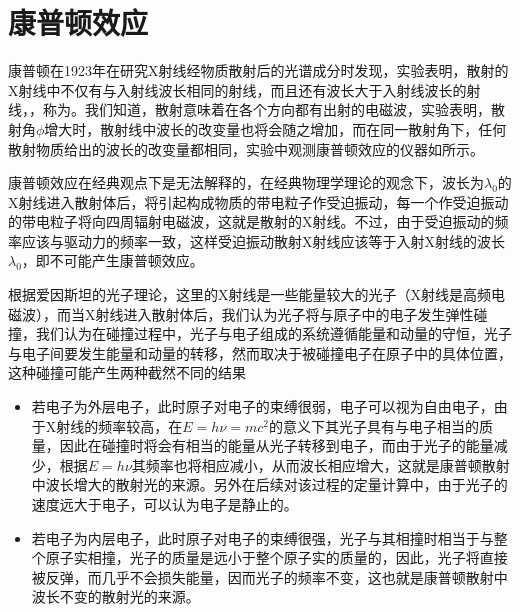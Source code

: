 \section{康普顿效应}
\label{sec:康普顿效应}
康普顿在1923年在研究X射线经物质散射后的光谱成分时发现，实验表明，散射的X射线中不仅有与入射线波长相同的射线，而且还有波长大于入射线波长的射线，，称为。我们知道，散射意味着在各个方向都有出射的电磁波，实验表明，散射角$\phi$增大时，散射线中波长的改变量也将会随之增加，而在同一散射角下，任何散射物质给出的波长的改变量都相同，实验中观测康普顿效应的仪器如所示。\goodbreak

康普顿效应在经典观点下是无法解释的，在经典物理学理论的观念下，波长为$\lambda_0$的X射线进入散射体后，将引起构成物质的带电粒子作受迫振动，每一个作受迫振动的带电粒子将向四周辐射电磁波，这就是散射的X射线。不过，由于受迫振动的频率应该与驱动力的频率一致，这样受迫振动散射X射线应该等于入射X射线的波长$\lambda_0$，即不可能产生康普顿效应。
\begin{OldFigure}[康普顿效应的实验仪器]
\end{OldFigure}

根据爱因斯坦的光子理论，这里的X射线是一些能量较大的光子（X射线是高频电磁波），而当X射线进入散射体后，我们认为光子将与原子中的电子发生弹性碰撞，我们认为在碰撞过程中，光子与电子组成的系统遵循能量和动量的守恒，光子与电子间要发生能量和动量的转移，然而取决于被碰撞电子在原子中的具体位置，这种碰撞可能产生两种截然不同的结果
\begin{itemize}
    \item 若电子为外层电子，此时原子对电子的束缚很弱，电子可以视为自由电子，由于X射线的频率较高，在$E=h\nu=mc^2$的意义下其光子具有与电子相当的质量，因此在碰撞时将会有相当的能量从光子转移到电子，而由于光子的能量减少，根据$E=h\nu$其频率也将相应减小，从而波长相应增大，这就是康普顿散射中波长增大的散射光的来源。另外在后续对该过程的定量计算中，由于光子的速度远大于电子，可以认为电子是静止的。
    \item 若电子为内层电子，此时原子对电子的束缚很强，光子与其相撞时相当于与整个原子实相撞，光子的质量是远小于整个原子实的质量的，因此，光子将直接被反弹，而几乎不会损失能量，因而光子的频率不变，这也就是康普顿散射中波长不变的散射光的来源。
\end{itemize}

